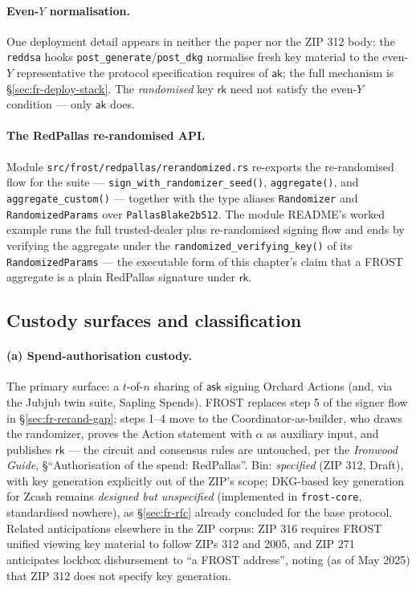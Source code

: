 \documentclass[11pt,a4paper]{article}
\theoremstyle{definition}
\newcommand{\rk}{\mathsf{rk}}
\newcommand{\ask}{\ensuremath{\mathsf{ask}}}
\newcommand{\aksym}{\ensuremath{\mathsf{ak}}}
\begin{document}
\paragraph{Even-$Y$ normalisation.} One deployment detail appears in
neither the paper nor the ZIP 312 body: the \texttt{reddsa} hooks
\texttt{post\_generate}/\texttt{post\_dkg} normalise fresh key material
to the even-$Y$ representative the protocol specification requires of
$\aksym$; the full mechanism is \S\ref{sec:fr-deploy-stack}. The
\emph{randomised} key $\rk$ need not satisfy the even-$Y$ condition ---
only $\aksym$ does.

\paragraph{The RedPallas re-randomised API.} Module
\texttt{src/frost/redpallas/rerandomized.rs} re-exports the
re-randomised flow for the suite ---
\texttt{sign\_with\_randomizer\_seed()}, \texttt{aggregate()}, and
\texttt{aggregate\_custom()} --- together with the type aliases
\texttt{Randomizer} and \texttt{RandomizedParams} over
\texttt{PallasBlake2b512}. The module README's worked example runs the
full trusted-dealer plus re-randomised signing flow and ends by
verifying the aggregate under the
\texttt{randomized\_verifying\_key()} of its \texttt{RandomizedParams}
--- the executable form of this chapter's claim that a FROST aggregate
is a plain RedPallas signature under $\rk$.

\subsection{Custody surfaces and classification}
\label{sec:fr-rerand-custody}

\paragraph{(a) Spend-authorisation custody.} The primary surface: a
$t$-of-$n$ sharing of $\ask$ signing Orchard Actions (and, via
the Jubjub twin suite, Sapling Spends). FROST replaces step 5 of the
signer flow in \S\ref{sec:fr-rerand-gap}; steps 1--4 move to the
Coordinator-as-builder, who draws the randomizer, proves the Action
statement with $\alpha$ as auxiliary input, and publishes $\rk$
--- the circuit and consensus rules are untouched, per the
\emph{Ironwood Guide}, \S``Authorisation of the spend: RedPallas''. Bin:
\emph{specified} (ZIP 312, Draft), with key generation explicitly out of
the ZIP's scope; DKG-based key generation for Zcash remains
\emph{designed but unspecified} (implemented in \texttt{frost-core},
standardised nowhere), as \S\ref{sec:fr-rfc} already concluded for the
base protocol. Related anticipations elsewhere in the ZIP corpus: ZIP
316 requires FROST unified viewing key material to follow ZIPs 312 and
2005, and ZIP 271 anticipates lockbox disbursement to ``a FROST
address'', noting (as of May 2025) that ZIP 312 does not specify key
generation.
\end{document}
